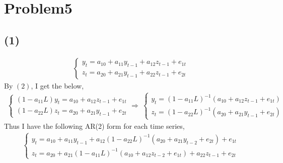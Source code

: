 \documentclass{article}
\begin{document}
\section{Problem5}
\subsection{(1)}
\begin{align}
	\begin{cases}
	y_t = a_{10} + a_{11}y_{t-1} + a_{12}z_{t-1} + e_{1t}\\
	z_t = a_{20} + a_{21}y_{t-1} + a_{22}z_{t-1} + e_{2t}
	\end{cases}
\end{align}
By $(2)$, I get the below,
\begin{align}
	\begin{cases}
	(1-a_{11}L)y_t = a_{10} + a_{12}z_{t-1} + e_{1t}\\
	(1-a_{22}L)z_t = a_{20} + a_{21}y_{t-1} + e_{2t}
	\end{cases}
	\Rightarrow\ 
	\begin{cases}
	y_t = (1-a_{11}L)^{-1} \left( a_{10} + a_{12}z_{t-1} + e_{1t} \right)\\
	z_t = (1-a_{22}L)^{-1} \left( a_{20} + a_{21}y_{t-1} + e_{2t} \right)
	\end{cases}
\end{align}
Thus I have the following AR(2) form for each time series,
\begin{align}
	\begin{cases}
	y_t = a_{10} + a_{11}y_{t-1} + a_{12} (1-a_{22}L)^{-1} \left( a_{20} + a_{21}y_{t-2} + e_{2t} \right) + e_{1t}\\
	z_t = a_{20} + a_{21} (1-a_{11}L)^{-1} \left( a_{10} + a_{12}z_{t-2} + e_{1t} \right) + a_{22}z_{t-1} + e_{2t}
	\end{cases}
\end{align}
\end{document}
